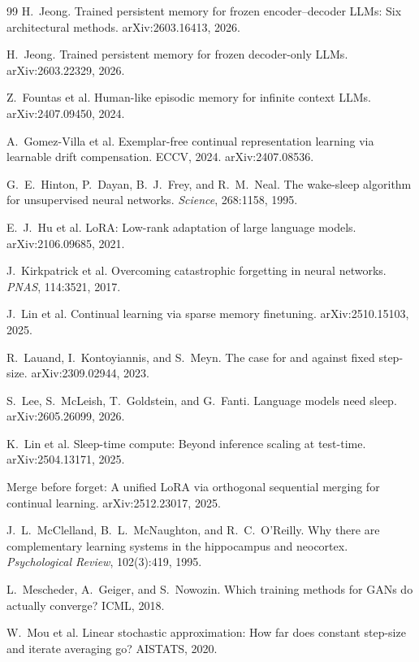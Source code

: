 \documentclass[11pt]{article}
\begin{document}
\begin{thebibliography}{99}
 H.\ Jeong. Trained persistent memory for frozen encoder--decoder LLMs: Six architectural methods. arXiv:2603.16413, 2026.

 H.\ Jeong. Trained persistent memory for frozen decoder-only LLMs. arXiv:2603.22329, 2026.

 Z.\ Fountas et al. Human-like episodic memory for infinite context LLMs. arXiv:2407.09450, 2024.

 A.\ Gomez-Villa et al. Exemplar-free continual representation learning via learnable drift compensation. ECCV, 2024. arXiv:2407.08536.

 G.\ E.\ Hinton, P.\ Dayan, B.\ J.\ Frey, and R.\ M.\ Neal. The wake-sleep algorithm for unsupervised neural networks. \textit{Science}, 268:1158, 1995.

 E.\ J.\ Hu et al. LoRA: Low-rank adaptation of large language models. arXiv:2106.09685, 2021.

 J.\ Kirkpatrick et al. Overcoming catastrophic forgetting in neural networks. \textit{PNAS}, 114:3521, 2017.

 J.\ Lin et al. Continual learning via sparse memory finetuning. arXiv:2510.15103, 2025.

 R.\ Lauand, I.\ Kontoyiannis, and S.\ Meyn. The case for and against fixed step-size. arXiv:2309.02944, 2023.

 S.\ Lee, S.\ McLeish, T.\ Goldstein, and G.\ Fanti. Language models need sleep. arXiv:2605.26099, 2026.

 K.\ Lin et al. Sleep-time compute: Beyond inference scaling at test-time. arXiv:2504.13171, 2025.

 Merge before forget: A unified LoRA via orthogonal sequential merging for continual learning. arXiv:2512.23017, 2025.

 J.\ L.\ McClelland, B.\ L.\ McNaughton, and R.\ C.\ O'Reilly. Why there are complementary learning systems in the hippocampus and neocortex. \textit{Psychological Review}, 102(3):419, 1995.

 L.\ Mescheder, A.\ Geiger, and S.\ Nowozin. Which training methods for GANs do actually converge? ICML, 2018.

 W.\ Mou et al. Linear stochastic approximation: How far does constant step-size and iterate averaging go? AISTATS, 2020.


\end{thebibliography}
\end{document}
